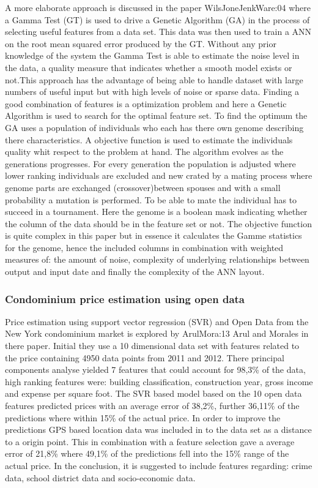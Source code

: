 A more elaborate approach is discussed in the paper \cite{art}{WilsJoneJenkWare:04} where a Gamma Test (GT) is used to drive a Genetic Algorithm (GA) in the process of selecting useful features from a data set. This data was then used to train a ANN on the root mean squared error produced by the GT. Without any prior knowledge of the system the Gamma Test is able to estimate the noise level in the data, a quality measure that indicates whether a smooth model exists or not.This approach has the advantage of being able to handle dataset with large numbers of useful input but with high levels of noise or sparse data. Finding a good combination of features is a optimization problem and here a Genetic Algorithm is used to search for the optimal feature set. To find the optimum the GA uses a population of individuals who each has there own genome describing there characteristics. A objective function is used to estimate the individuals quality whit respect to the problem at hand. The algorithm evolves as the generations progresses. For every generation the population is adjusted where lower ranking individuals are excluded and new crated by a mating process where genome parts are exchanged (crossover)between spouses and with a small probability a mutation is performed. To be able to mate the individual has to succeed in a tournament. Here the genome is a boolean mask indicating whether the column of the data should be in the feature set or not. The objective function is quite complex in this paper but in essence it calculates the Gamme statistics for the genome, hence the included columns in combination with weighted measures of: the amount of noise, complexity of underlying relationships between output and input date and finally the complexity of the ANN layout.   

\subsubsection{Condominium price estimation using open data} \label{sss:using_open_data}
Price estimation using support vector regression (SVR) and Open Data from the New York condominium market is explored by \cite{art}{ArulMora:13} Arul and Morales in there paper. Initial they use a 10 dimensional data set with features related to the price containing 4950 data points from 2011 and 2012. There principal components analyse yielded 7 features that could account for 98,3\% of the data, high ranking features were: building classification, construction year, gross income and expense per square foot. The SVR based model based on the 10 open data features predicted prices with an average error of 38,2\%, further 36,11\% of the predictions where within 15\% of the actual price. In order to improve the predictions GPS based location data was included in to the data set as a distance to a origin point. This in combination with a feature selection gave a average error of 21,8\% where 49,1\% of the predictions fell into the 15\% range of the actual price. In the conclusion, it is suggested to include features regarding: crime data, school district data and socio-economic data.    

